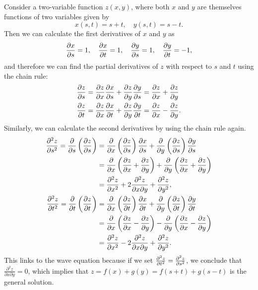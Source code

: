 \documentclass[../multivariate_calculus.tex]{subfiles}
\begin{document}
        \begin{example}\label{ex-chain-rule}
            Consider a two-variable function $z(x,y)$, where both $x$ and $y$ are themselves functions of two variables given by
            \begin{equation}
                x(s,t)=s+t,\quad y(s,t)=s-t.
            \end{equation}
            Then we can calculate the first derivatives of $x$ and $y$ as
            \begin{equation}
                \pdv{x}{s}=1,\quad\pdv{x}{t}=1,\quad\pdv{y}{s}=1,\quad\pdv{y}{t}=-1,
            \end{equation}
            and therefore we can find the partial derivatives of $z$ with respect to $s$ and $t$ using the chain rule:
            \begin{align}
                \pdv{z}{s}&=\pdv{z}{x}\pdv{x}{s}+\pdv{z}{y}\pdv{y}{s}=\pdv{z}{x}+\pdv{z}{y}\\
                \pdv{z}{t}&=\pdv{z}{x}\pdv{x}{t}+\pdv{z}{y}\pdv{y}{t}=\pdv{z}{x}-\pdv{z}{y}.
            \end{align}
            Similarly, we can calculate the second derivatives by using the chain rule again.
            \begin{align}
                \pdv[2]{z}{s}=\frac{\partial}{\partial s}\left(\pdv{z}{s}\right)&=\frac{\partial}{\partial x}\left(\pdv{z}{s}\right)\pdv{x}{s}+\frac{\partial}{\partial y}\left(\pdv{z}{s}\right)\pdv{y}{s}\\
                &=\frac{\partial}{\partial x}\left(\pdv{z}{x}+\pdv{z}{y}\right)+\frac{\partial}{\partial y}\left(\pdv{z}{x}+\pdv{z}{y}\right)\\
                &=\pdv[2]{z}{x}+2\frac{\partial^2 z}{\partial x\partial y}+\pdv[2]{z}{y},\\
                \pdv[2]{z}{t}=\frac{\partial}{\partial t}\left(\pdv{z}{t}\right)&=\frac{\partial}{\partial x}\left(\pdv{z}{t}\right)\pdv{x}{t}+\frac{\partial}{\partial y}\left(\pdv{z}{t}\right)\pdv{y}{t}\\
                &=\frac{\partial}{\partial x}\left(\pdv{z}{x}-\pdv{z}{y}\right)-\frac{\partial}{\partial y}\left(\pdv{z}{x}-\pdv{z}{y}\right)\\
                &=\pdv[2]{z}{x}-2\frac{\partial^2 z}{\partial x\partial y}+\pdv[2]{z}{y}.
            \end{align}
            This links to the wave equation because if we set $\pdv[2]{z}{t}=\pdv[2]{z}{s}$, we conclude that $\frac{\partial^2 z}{\partial x\partial y}=0$, which implies that $z=f(x)+g(y)=f(s+t)+g(s-t)$ is the general solution.
        \end{example}
\end{document}
